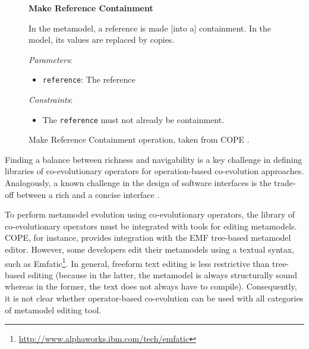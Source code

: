 \begin{figure}[htbp]
	\begin{framed}
		\textbf{Make Reference Containment}

		In the metamodel, a reference is made [into a] containment. In the model, its values are replaced by copies.


		\emph{Parameters}:
		\begin{itemize}
			\item \texttt{reference}: The reference
		\end{itemize}

		\emph{Constraints}:
		\begin{itemize}
			\item The \texttt{reference} must not already be containment.
		\end{itemize}
	\end{framed}
	\caption[COPE's Make Reference Containment operation.]{Make Reference Containment operation, taken from COPE \cite{herrmannsdoerfer09cope}.}
\label{fig:cope_op}
\end{figure}

Finding a balance between richness and navigability is a key challenge in defining libraries of co-evolutionary operators for operation-based co-evolution approaches. Analogously, a known challenge in the design of software interfaces is the trade-off between a rich and a concise interface \cite{bloch05apis}.

To perform metamodel evolution using co-evolutionary operators, the library of co-evolutionary operators must be integrated with tools for editing metamodels. COPE, for instance, provides integration with the EMF tree-based metamodel editor. However, some developers edit their metamodels using a textual syntax, such as Emfatic\footnote{\url{http://www.alphaworks.ibm.com/tech/emfatic}}. In general, freeform text editing is less restrictive than tree-based editing (because in the latter, the metamodel is always structurally sound whereas in the former, the text does not always have to compile). Consequently, it is not clear whether operator-based co-evolution can be used with all categories of metamodel editing tool.

